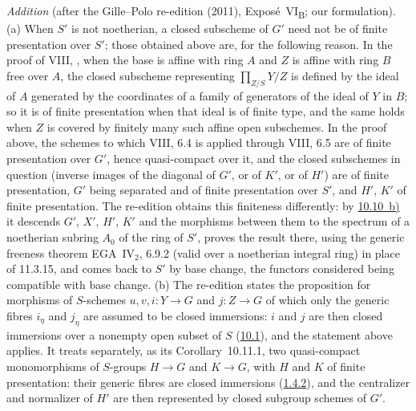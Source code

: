 \par\medskip\noindent
\emph{Addition} (after the Gille--Polo re-edition (2011), Expos\'e~VI\textsubscript{B}; our formulation).
(a) When \(S'\) is not noetherian, a closed subscheme of \(G'\) need not be of finite presentation over \(S'\);
those obtained above are, for the following reason. In the proof of VIII,
, when the base is affine with ring \(A\) and \(Z\) is affine with ring
\(B\) free over \(A\), the closed subscheme representing \(\prod_{Z/S}Y/Z\) is defined by the ideal of \(A\)
generated by the coordinates of a family of generators of the ideal of \(Y\) in \(B\); so it is of finite
presentation when that ideal is of finite type, and the same holds when \(Z\) is covered by finitely many such
affine open subschemes. In the proof above, the schemes to which VIII, 6.4 is applied through VIII, 6.5 are of
finite presentation over \(G'\), hence quasi-compact over it, and the closed subschemes in question (inverse
images of the diagonal of \(G'\), or of \(K'\), or of \(H'\)) are of finite presentation, \(G'\) being
separated and of finite presentation over \(S'\), and \(H'\), \(K'\) of finite presentation. The re-edition
obtains this finiteness differently: by \hyperref[par:sga3-VIB-10.10-b]{10.10~b)} it descends \(G'\), \(X'\),
\(H'\), \(K'\) and the morphisms between them to the spectrum of a noetherian subring \(A_0\) of the ring of
\(S'\), proves the result there, using the generic freeness theorem EGA~IV\(_2\), 6.9.2 (valid over a noetherian
integral ring) in place of 11.3.15, and comes back to \(S'\) by base change, the functors considered being
compatible with base change.
(b) The re-edition states the proposition for morphisms of \(S\)-schemes \(u,v,i\colon Y\to G\) and
\(j\colon Z\to G\) of which only the generic fibres \(i_\eta\) and \(j_\eta\) are assumed to be closed
immersions: \(i\) and \(j\) are then closed immersions over a nonempty open subset of \(S\)
(\hyperref[par:sga3-VIB-10.1]{10.1}), and the statement above applies. It treats separately, as its
Corollary~10.11.1, two quasi-compact monomorphisms of \(S\)-groups \(H\to G\) and \(K\to G\), with \(H\) and \(K\)
of finite presentation: their generic fibres are closed immersions
(\hyperref[cor:sga3-VIB-1.4.2]{1.4.2}), and the centralizer and normalizer of \(H'\) are then represented by
closed subgroup schemes of \(G'\).
